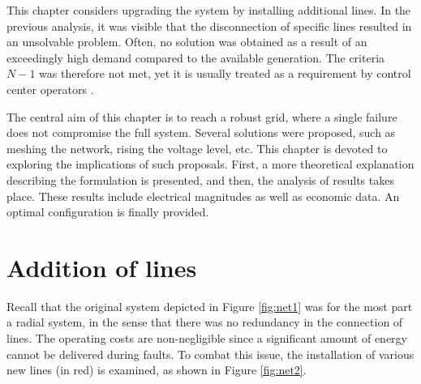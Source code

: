 This chapter considers upgrading the system by installing additional lines. In the previous analysis, it was visible that the disconnection of specific lines resulted in an unsolvable problem. Often, no solution was obtained as a result of an exceedingly high demand compared to the available generation. The criteria $N-1$ was therefore not met, yet it is usually treated as a requirement by control center operators \cite{wang2013risk, gourtani2016robust}. 

The central aim of this chapter is to reach a robust grid, where a single failure does not compromise the full system. Several solutions were proposed, such as meshing the network, rising the voltage level, etc. This chapter is devoted to exploring the implications of such proposals. First, a more theoretical explanation describing the formulation is presented, and then, the analysis of results takes place. These results include electrical magnitudes as well as economic data. An optimal configuration is finally provided.

\section{Addition of lines}
Recall that the original system depicted in Figure \ref{fig:net1} was for the most part a radial system, in the sense that there was no redundancy in the connection of lines. The operating costs are non-negligible since a significant amount of energy cannot be delivered during faults. To combat this issue, the installation of various new lines (in red) is examined, as shown in Figure \ref{fig:net2}.


